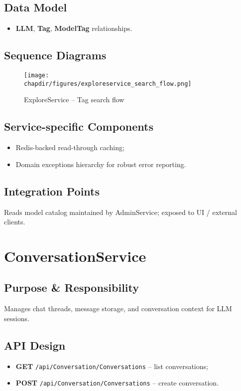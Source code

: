 \subsection{Data Model}
\begin{itemize}
  \item \textbf{LLM}, \textbf{Tag}, \textbf{ModelTag} relationships.
\end{itemize}

\subsection{Sequence Diagrams}
\begin{figure}[h]
    \centering
    \texttt{[image: \\chapdir/figures/exploreservice\_search\_flow.png]}
    \caption{ExploreService – Tag search flow}
\end{figure}

\subsection{Service-specific Components}
\begin{itemize}
  \item Redis-backed read-through caching;
  \item Domain exceptions hierarchy for robust error reporting.
\end{itemize}

\subsection{Integration Points}
Reads model catalog maintained by AdminService; exposed to UI / external clients.

\section{ConversationService}
\subsection{Purpose \& Responsibility}
Manages chat threads, message storage, and conversation context for LLM sessions.

\subsection{API Design}
\begin{itemize}
  \item \textbf{GET} \texttt{/api/Conversation/Conversations} – list conversations;
  \item \textbf{POST} \texttt{/api/Conversation/Conversations} – create conversation.
\end{itemize}

